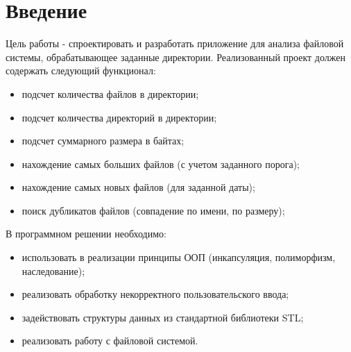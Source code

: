 \chapter*{Введение} %

Цель работы - спроектировать и разработать приложение для анализа файловой системы, обрабатывающее заданные директории.
Реализованный проект должен содержать следующий функционал:
\begin{itemize}
	\item подсчет количества файлов в директории;
	\item подсчет количества директорий в директории;
	\item подсчет суммарного размера в байтах;
	\item нахождение самых больших файлов (с учетом заданного порога);
	\item нахождение самых новых файлов (для заданной даты);
	\item поиск дубликатов файлов (совпадение по имени, по размеру); \\
\end{itemize}

В программном решении необходимо:
\begin{itemize}
	\item использовать в реализации принципы ООП (инкапсуляция, полиморфизм, наследование);
	\item реализовать обработку некорректного пользовательского ввода;
	\item задействовать структуры данных из стандартной библиотеки STL;
	\item реализовать работу с файловой системой.
\end{itemize}

